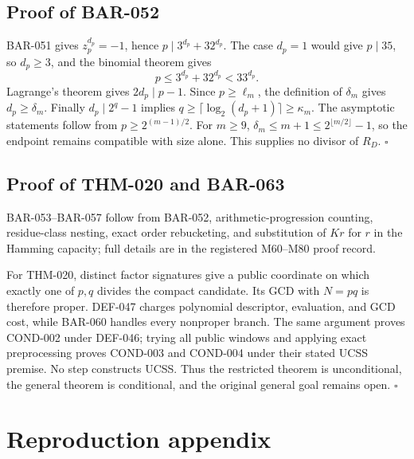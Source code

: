 \documentclass[11pt]{article}
\begin{document}
\subsection{Proof of BAR-052}
\label{proof:BAR-052}

BAR-051 gives \(z_p^{d_p}=-1\), hence
\(p\mid3^{d_p}+32^{d_p}\). The case \(d_p=1\) would give \(p\mid35\),
so \(d_p\ge3\), and the binomial theorem gives
\[
p\le3^{d_p}+32^{d_p}<33^{d_p}.
\]
Lagrange's theorem gives \(2d_p\mid p-1\). Since \(p\ge\ell_m\),
the definition of \(\delta_m\) gives \(d_p\ge\delta_m\).
Finally \(d_p\mid2^q-1\) implies
\(q\ge\lceil\log_2(d_p+1)\rceil\ge\kappa_m\).
The asymptotic statements follow from \(p\ge2^{(m-1)/2}\).
For \(m\ge9\), \(\delta_m\le m+1\le
2^{\lfloor m/2\rfloor}-1\), so the endpoint remains compatible with size
alone. This supplies no divisor of \(R_D\). \(\square\)

\subsection{Proof of THM-020 and BAR-063}
\label{proof:THM-020-BAR-063}

BAR-053--BAR-057 follow from BAR-052, arithmetic-progression counting,
residue-class nesting, exact order rebucketing, and substitution of \(Kr\)
for \(r\) in the Hamming capacity; full details are in the registered
M60--M80 proof record.

For THM-020, distinct factor signatures give a public coordinate on which
exactly one of \(p,q\) divides the compact candidate. Its GCD with
\(N=pq\) is therefore proper. DEF-047 charges polynomial descriptor,
evaluation, and GCD cost, while BAR-060 handles every nonproper branch.
The same argument proves COND-002 under DEF-046; trying all public windows
and applying exact preprocessing proves COND-003 and COND-004 under their
stated UCSS premise. No step constructs UCSS. Thus the restricted theorem
is unconditional, the general theorem is conditional, and the original
general goal remains open. \(\square\)

\clearpage
\section{Reproduction appendix}
\end{document}
